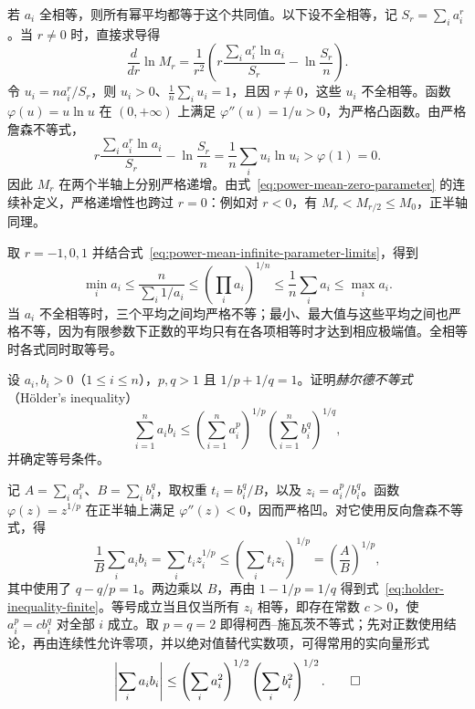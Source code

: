\begin{solve}
若 $a_i$ 全相等，则所有幂平均都等于这个共同值。以下设不全相等，记 $S_r=\sum_i a_i^r$。当 $r\neq0$ 时，直接求导得
\[
    \frac{d}{dr}\ln M_r
    =\frac1{r^2}\left(
       r\frac{\sum_i a_i^r\ln a_i}{S_r}-\ln\frac{S_r}n\right).
\]
令 $u_i=na_i^r/S_r$，则 $u_i>0$、$\frac1n\sum_i u_i=1$，且因 $r\neq0$，这些 $u_i$ 不全相等。函数 $\varphi(u)=u\ln u$ 在 $(0,+\infty)$ 上满足 $\varphi''(u)=1/u>0$，为严格凸函数。由严格詹森不等式，
\[
    r\frac{\sum_i a_i^r\ln a_i}{S_r}-\ln\frac{S_r}n
    =\frac1n\sum_i u_i\ln u_i>\varphi(1)=0.
\]
因此 $M_r$ 在两个半轴上分别严格递增。由式~\eqref{eq:power-mean-zero-parameter} 的连续补定义，严格递增性也跨过 $r=0$：例如对 $r<0$，有 $M_r<M_{r/2}\leq M_0$，正半轴同理。

取 $r=-1,0,1$ 并结合式~\eqref{eq:power-mean-infinite-parameter-limits}，得到
\begin{equation}
    \min_i a_i
    \leq\frac{n}{\sum_i1/a_i}
    \leq\left(\prod_i a_i\right)^{1/n}
    \leq\frac1n\sum_i a_i
    \leq\max_i a_i.
    \label{eq:harmonic-geometric-arithmetic-mean-chain}
\end{equation}
当 $a_i$ 不全相等时，三个平均之间均严格不等；最小、最大值与这些平均之间也严格不等，因为有限参数下正数的平均只有在各项相等时才达到相应极端值。全相等时各式同时取等号。
\end{solve}

\begin{example}
\label{ex:holder-inequality-from-concavity}
设 $a_i,b_i>0$（$1\leq i\leq n$），$p,q>1$ 且 $1/p+1/q=1$。证明\emph{赫尔德不等式}（H\"older's inequality）
\begin{equation}
    \sum_{i=1}^n a_ib_i
    \leq\left(\sum_{i=1}^n a_i^p\right)^{1/p}
         \left(\sum_{i=1}^n b_i^q\right)^{1/q},
    \label{eq:holder-inequality-finite}
\end{equation}
并确定等号条件。
\end{example}

\begin{solve}
记 $A=\sum_i a_i^p$、$B=\sum_i b_i^q$，取权重 $t_i=b_i^q/B$，以及 $z_i=a_i^p/b_i^q$。函数 $\varphi(z)=z^{1/p}$ 在正半轴上满足 $\varphi''(z)<0$，因而严格凹。对它使用反向詹森不等式，得
\[
    \frac1B\sum_i a_ib_i
    =\sum_i t_i z_i^{1/p}
    \leq\left(\sum_i t_i z_i\right)^{1/p}
    =\left(\frac AB\right)^{1/p},
\]
其中使用了 $q-q/p=1$。两边乘以 $B$，再由 $1-1/p=1/q$ 得到式~\eqref{eq:holder-inequality-finite}。等号成立当且仅当所有 $z_i$ 相等，即存在常数 $c>0$，使 $a_i^p=cb_i^q$ 对全部 $i$ 成立。取 $p=q=2$ 即得柯西--施瓦茨不等式；先对正数使用结论，再由连续性允许零项，并以绝对值替代实数项，可得常用的实向量形式
\[
    \left|\sum_i a_ib_i\right|
    \leq\left(\sum_i a_i^2\right)^{1/2}
         \left(\sum_i b_i^2\right)^{1/2}.
    \qedhere
\]
\end{solve}

